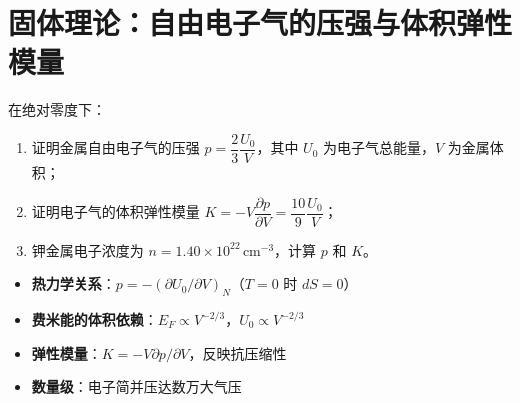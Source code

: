 \section{固体理论：自由电子气的压强与体积弹性模量}
\label{sec:free-electron-pressure}

\begin{modelbox}
在绝对零度下：
\begin{enumerate}
    \item 证明金属自由电子气的压强 $p=\dfrac{2}{3}\dfrac{U_0}{V}$，其中 $U_0$ 为电子气总能量，$V$ 为金属体积；
    \item 证明电子气的体积弹性模量 $K=-V\dfrac{\partial p}{\partial V}=\dfrac{10}{9}\dfrac{U_0}{V}$；
    \item 钾金属电子浓度为 $n=1.40\times10^{22}\,\text{cm}^{-3}$，计算 $p$ 和 $K$。
\end{enumerate}
\end{modelbox}

\begin{tipbox}[考点快速分析]
\begin{itemize}
    \item \textbf{热力学关系}：$p=-(\partial U_0/\partial V)_N$（$T=0$ 时 $dS=0$）
    \item \textbf{费米能的体积依赖}：$E_F\propto V^{-2/3}$，$U_0\propto V^{-2/3}$
    \item \textbf{弹性模量}：$K=-V\partial p/\partial V$，反映抗压缩性
    \item \textbf{数量级}：电子简并压达数万大气压
\end{itemize}
\end{tipbox}

